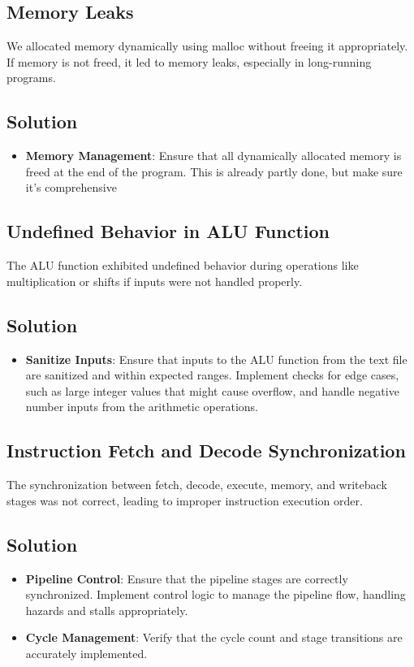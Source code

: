 \documentclass{article}
\begin{document}
\subsection{Memory Leaks}

We allocated memory dynamically using malloc without freeing it appropriately. If memory is not freed, it led to memory leaks, especially in long-running programs.

\subsection{Solution}
\begin{itemize}
    \item \textbf{Memory Management}: Ensure that all dynamically allocated memory is freed at the end of the program. This is already partly done, but make sure it's comprehensive
\end{itemize}

\subsection{Undefined Behavior in ALU Function}

The ALU function exhibited undefined behavior during operations like multiplication or shifts if inputs were not handled properly.

\subsection{Solution}
\begin{itemize}
    \item\textbf{Sanitize Inputs}: Ensure that inputs to the ALU function from the text file are sanitized and within expected ranges. Implement checks for edge cases, such as large integer values that might cause overflow, and handle negative number inputs from the arithmetic operations.
\end{itemize}

\subsection{Instruction Fetch and Decode Synchronization}

The synchronization between fetch, decode, execute, memory, and writeback stages was not correct, leading to improper instruction execution order.

\subsection{Solution}
\begin{itemize}
    \item \textbf{Pipeline Control}: Ensure that the pipeline stages are correctly synchronized. Implement control logic to manage the pipeline flow, handling hazards and stalls appropriately.
    \item \textbf{Cycle Management}: Verify that the cycle count and stage transitions are accurately implemented.
\end{itemize}
\end{document}
